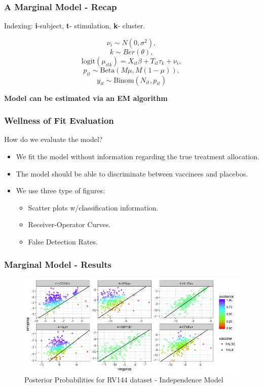 \documentclass{beamer}
\theoremstyle{definition}
\begin{document}

\begin{frame}
\frametitle{A Marginal Model - Recap}
\begin{framed}
Indexing: \textbf{i}-subject, \textbf{t}- stimulation, \textbf{k}- cluster.
\end{framed}
$$
\nu_i \sim N(0, \sigma^{2}),
$$$$
k \sim Ber(\theta),
$$$$
\text{logit}(\mu_{itk}) = X_{it} \beta + T_{it}\tau_{k} + \nu_i,
$$$$
p_{it} \sim \text{Beta}(M\mu, M(1 - \mu)),
$$$$
y_{it} \sim \text{Binom}(N_{it}, p_{it})
$$

\vspace{0.3 cm}
\textbf{Model can be estimated via an EM algorithm}
\end{frame}


\begin{frame}
\frametitle{Wellness of Fit Evaluation}
How do we evaluate the model?
\begin{itemize}
\item We fit the model without information regarding the true treatment allocation. 
\vspace{0.3 cm}
\item The model should be able to discriminate between vaccinees and placebos.
\vspace{0.3 cm}
\pause
\item We use three type of figures:
	\begin{itemize}
	\item Scatter plots w/classification information.
	\item Receiver-Operator Curves.
	\item False Detection Rates. 
	\end{itemize}
\end{itemize}
\end{frame}


\begin{frame}
\frametitle{Marginal Model - Results}
\begin{center}
\begin{figure}[]
\includegraphics[width=12 cm]{figures/marginalBooleansIndependenceScatter}
 \caption{Posterior Probabilities for RV144 dataset - Independence Model}
\end{figure}
\end{center}
\end{frame}
\end{document}

